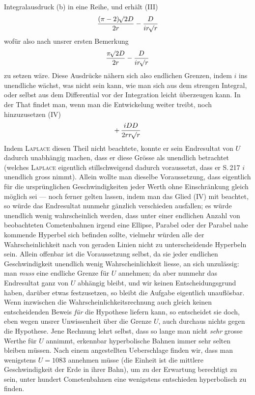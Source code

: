 Integralausdruck (b) in eine Reihe, und erhält (III)
\[\frac{(\pi-2)\mathord{{}^{}\!\surd}2D}{2r} - \frac{D}{ir\mathord{{}^{}\!\surd}r}\]
wofür also nach unsrer ersten Bemerkung
\[
\frac{\pi\mathord{{}^{}\!\surd}2D}{2r} - \frac{D}{ir\mathord{{}^{}\!\surd}r}
\]
zu setzen wäre. Diese Ausdrücke nähern sich also endlichen Grenzen, indem $i$ ins unendliche wächst,
was nicht sein kann, wie man sich aus dem strengen Integral, oder selbst aus dem Differential vor
der Integration leicht überzeugen kann. In der That findet man, wenn man die Entwickelung weiter
treibt, noch hinzuzusetzen (IV)
\[+\,\frac{iDD}{2rr\mathord{{}^{}\!\surd}r}\]
Indem \textsc{Laplace} diesen Theil nicht beachtete, konnte er sein Endresultat von $U$ dadurch unabhängig
machen, dass er diese Grösse als unendlich betrachtet (welches \textsc{Laplace} eigentlich stillschweigend
dadurch voraussetzt, dass er S.\,217 $i$ unendlich gross nimmt). Allein wollte man dieselbe
Voraussetzung, dass eigentlich für die ursprünglichen Geschwindigkeiten jeder Werth ohne
Einschränkung gleich möglich sei --- noch ferner gelten lassen, indem man das Glied (IV) mit
beachtet, so würde das Endresultat nunmehr gänzlich verschieden ausfallen; es würde unendlich wenig
wahrscheinlich werden, dass unter einer endlichen Anzahl von beobachteten Cometenbahnen irgend eine
Ellipse, Parabel oder der Parabel nahe kommende Hyperbel sich befinden sollte, vielmehr würden alle
der Wahrscheinlichkeit nach von geraden Linien nicht zu unterscheidende Hyperbeln sein. Allein
offenbar ist die Voraussetzung selbst, da sie jeder endlichen Geschwindigkeit unendlich wenig
Wahrscheinlichkeit liesse, an sich unzulässig: man \emph{muss} eine endliche Grenze für $U$
annehmen; da aber nunmehr das Endresultat ganz von $U$ abhängig bleibt, und wir keinen
Entscheidungsgrund haben, darüber etwas festzusetzen, so bleibt die Aufgabe eigentlich unauflösbar.
Wenn inzwischen die Wahrscheinlichkeitsrechnung auch gleich keinen entscheidenden Beweis
\emph{für} die Hypothese liefern kann, so entscheidet sie doch, eben wegen unsrer Unwissenheit über
die Grenze $U$, auch durchaus nichts gegen die Hypothese. Jene Rechnung lehrt selbst, dass so lange
man nicht \emph{sehr} grosse Werthe für $U$ annimmt, erkennbar hyperbolische Bahnen immer sehr
selten bleiben müssen. Nach einem angestellten Ueberschlage finden wir, dass man wenigstens
$U = 1083$ annehmen müsse (die Einheit ist die mittlere Geschwindigkeit der Erde in ihrer Bahn), um
zu der Erwartung berechtigt zu sein, unter hundert Cometenbahnen eine wenigstens entschieden
hyperbolisch zu finden.
\par
\clearpage
\thispagestyle{empty}
